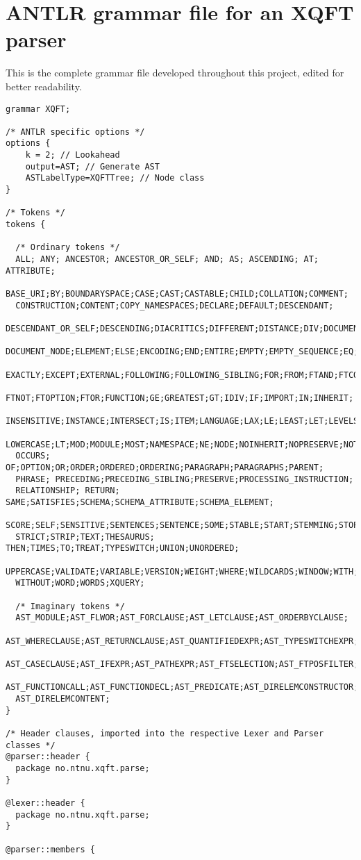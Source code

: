 \chapter{ANTLR grammar file for an XQFT parser }
This is the complete grammar file developed throughout this project, edited for
better readability.

\begin{verbatim}
grammar XQFT;

/* ANTLR specific options */
options { 
    k = 2; // Lookahead
    output=AST; // Generate AST
    ASTLabelType=XQFTTree; // Node class
}

/* Tokens */
tokens {

  /* Ordinary tokens */
  ALL; ANY; ANCESTOR; ANCESTOR_OR_SELF; AND; AS; ASCENDING; AT; ATTRIBUTE; 
  BASE_URI;BY;BOUNDARYSPACE;CASE;CAST;CASTABLE;CHILD;COLLATION;COMMENT;
  CONSTRUCTION;CONTENT;COPY_NAMESPACES;DECLARE;DEFAULT;DESCENDANT;
  DESCENDANT_OR_SELF;DESCENDING;DIACRITICS;DIFFERENT;DISTANCE;DIV;DOCUMENT;
  DOCUMENT_NODE;ELEMENT;ELSE;ENCODING;END;ENTIRE;EMPTY;EMPTY_SEQUENCE;EQ;EVERY;
  EXACTLY;EXCEPT;EXTERNAL;FOLLOWING;FOLLOWING_SIBLING;FOR;FROM;FTAND;FTCONTAINS;
  FTNOT;FTOPTION;FTOR;FUNCTION;GE;GREATEST;GT;IDIV;IF;IMPORT;IN;INHERIT;
  INSENSITIVE;INSTANCE;INTERSECT;IS;ITEM;LANGUAGE;LAX;LE;LEAST;LET;LEVELS;
  LOWERCASE;LT;MOD;MODULE;MOST;NAMESPACE;NE;NODE;NOINHERIT;NOPRESERVE;NOT;
  OCCURS; OF;OPTION;OR;ORDER;ORDERED;ORDERING;PARAGRAPH;PARAGRAPHS;PARENT;
  PHRASE; PRECEDING;PRECEDING_SIBLING;PRESERVE;PROCESSING_INSTRUCTION;
  RELATIONSHIP; RETURN; SAME;SATISFIES;SCHEMA;SCHEMA_ATTRIBUTE;SCHEMA_ELEMENT;
  SCORE;SELF;SENSITIVE;SENTENCES;SENTENCE;SOME;STABLE;START;STEMMING;STOP;
  STRICT;STRIP;TEXT;THESAURUS; THEN;TIMES;TO;TREAT;TYPESWITCH;UNION;UNORDERED;
  UPPERCASE;VALIDATE;VARIABLE;VERSION;WEIGHT;WHERE;WILDCARDS;WINDOW;WITH;
  WITHOUT;WORD;WORDS;XQUERY;

  /* Imaginary tokens */
  AST_MODULE;AST_FLWOR;AST_FORCLAUSE;AST_LETCLAUSE;AST_ORDERBYCLAUSE;
  AST_WHERECLAUSE;AST_RETURNCLAUSE;AST_QUANTIFIEDEXPR;AST_TYPESWITCHEXPR;
  AST_CASECLAUSE;AST_IFEXPR;AST_PATHEXPR;AST_FTSELECTION;AST_FTPOSFILTER;
  AST_FUNCTIONCALL;AST_FUNCTIONDECL;AST_PREDICATE;AST_DIRELEMCONSTRUCTOR;
  AST_DIRELEMCONTENT;
}

/* Header clauses, imported into the respective Lexer and Parser classes */
@parser::header {
  package no.ntnu.xqft.parse;
}

@lexer::header {
  package no.ntnu.xqft.parse;  
}

@parser::members {


\end{verbatim}
